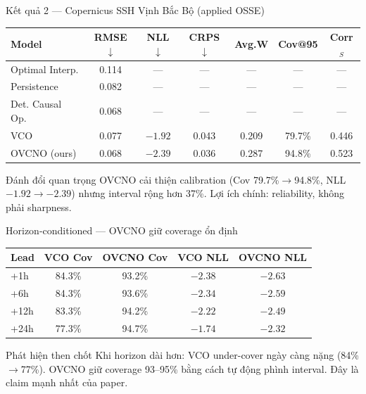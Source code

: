 \documentclass[11pt,aspectratio=169]{beamer}
\begin{document}
\begin{frame}{Kết quả 2 --- Copernicus SSH Vịnh Bắc Bộ (applied OSSE)}
  \small \centering
  \begin{tabular}{@{}l c c c c c c@{}}
    \toprule
    \textbf{Model} & \textbf{RMSE}$\downarrow$ & \textbf{NLL}$\downarrow$ & \textbf{CRPS}$\downarrow$ & \textbf{Avg.W} & \textbf{Cov@95} & \textbf{Corr}$_S$ \\
    \midrule
    Optimal Interp. & 0.114 & --- & --- & --- & --- & --- \\
    Persistence & 0.082 & --- & --- & --- & --- & --- \\
    Det. Causal Op. & 0.068 & --- & --- & --- & --- & --- \\
    VCO & 0.077 & $-1.92$ & 0.043 & \alert{0.209} & \alert{79.7\%} & 0.446 \\
    \alert{OVCNO (ours)} & \alert{0.068} & \alert{$-2.39$} & \alert{0.036} & 0.287 & \alert{94.8\%} & \alert{0.523} \\
    \bottomrule
  \end{tabular}

  \vspace{10pt}
  \begin{block}{Đánh đổi quan trọng}
    OVCNO \alert{cải thiện calibration} (Cov 79.7\%$\to$94.8\%, NLL $-1.92 \to -2.39$) nhưng interval rộng hơn 37\%. Lợi ích chính: \alert{reliability}, không phải sharpness.
  \end{block}
\end{frame}

\begin{frame}{Horizon-conditioned --- OVCNO giữ coverage ổn định}
  \small \centering
  \begin{tabular}{@{}l c c c c@{}}
    \toprule
    \textbf{Lead} & \textbf{VCO Cov} & \textbf{OVCNO Cov} & \textbf{VCO NLL} & \textbf{OVCNO NLL} \\
    \midrule
    +1h & 84.3\% & \alert{93.2\%} & $-2.38$ & \alert{$-2.63$} \\
    +6h & 84.3\% & \alert{93.6\%} & $-2.34$ & \alert{$-2.59$} \\
    +12h & 83.3\% & \alert{94.2\%} & $-2.22$ & \alert{$-2.49$} \\
    +24h & \alert{77.3\%} & \alert{94.7\%} & $-1.74$ & \alert{$-2.32$} \\
    \bottomrule
  \end{tabular}

  \vspace{8pt}
  \begin{block}{Phát hiện then chốt}
    Khi horizon dài hơn: \alert{VCO under-cover ngày càng nặng} (84\%$\to$77\%). OVCNO \alert{giữ coverage 93--95\%} bằng cách \alert{tự động phình interval}. Đây là claim mạnh nhất của paper.
  \end{block}
\end{frame}
\end{document}
